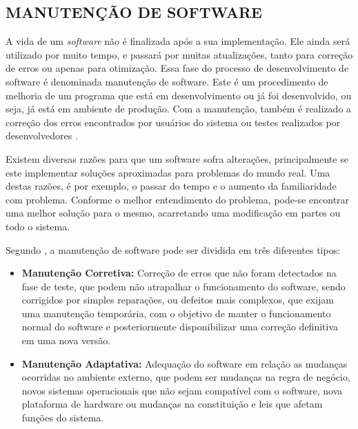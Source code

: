 \subsection{MANUTENÇÃO DE SOFTWARE}
\label{subsec:manutencaoDeSoftware}

A vida de um \textit{software} não é finalizada após a sua implementação. Ele ainda será utilizado por muito tempo, e passará por muitas atualizações, tanto para correção de erros ou apenas para otimização. Essa fase do processo de desenvolvimento de software é denominada manutenção de software. Este é um procedimento de melhoria de um programa que está em desenvolvimento ou já foi desenvolvido, ou seja, já está em ambiente de produção. Com a manutenção, também é realizado a correção dos erros encontrados por usuários do sistema ou testes realizados por desenvolvedores \cite{rodrigoSpinola2011}.

Existem diversas razões para que um software sofra alterações, principalmente se este implementar soluções aproximadas para problemas do mundo real. Uma destas razões, é por exemplo, o passar do tempo e o aumento da familiaridade com problema. Conforme o melhor entendimento do problema, pode-se encontrar uma melhor solução para o mesmo, acarretando uma modificação em partes ou todo o sistema. 

Segundo , a manutenção de software pode ser dividida em três diferentes tipos:


\begin{itemize}
    \item \textbf{Manutenção Corretiva:} Correção de erros que não foram detectados na fase de teste, que podem não atrapalhar o funcionamento do software, sendo corrigidos por simples reparações, ou defeitos mais complexos, que exijam uma manutenção temporária, com o objetivo de manter o funcionamento normal do software e posteriormente disponibilizar uma correção definitiva em uma nova versão. 
\end{itemize}
    
\begin{itemize}  
    \item \textbf{Manutenção Adaptativa:} Adequação do software em relação as mudanças ocorridas no ambiente externo, que podem ser mudanças na regra de negócio, novos sistemas operacionais que não sejam compatível com o software, nova plataforma de hardware ou mudanças na constituição e leis que afetam funções do sistema.
\end{itemize}
    
